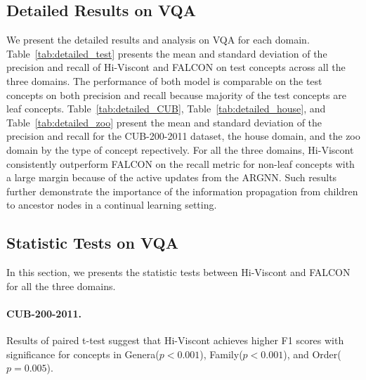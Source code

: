\begin{table*}[t]
\caption{The mean and standard deviation of precision and recall for the two models on the zoo domain by type of concepts.}
\label{tab:detailed_zoo}
\end{table*}

\subsection{Detailed Results on VQA}
We present the detailed results and analysis on VQA for each domain. Table~\ref{tab:detailed_test} presents the mean and standard deviation of the precision and recall of Hi-Viscont and FALCON on test concepts across all the three domains. The performance of both model is comparable on the test concepts on both precision and recall because majority of the test concepts are leaf concepts. Table~\ref{tab:detailed_CUB}, Table~\ref{tab:detailed_house}, and Table~\ref{tab:detailed_zoo} present the mean and standard deviation of the precision and recall for the CUB-200-2011 dataset, the house domain, and the zoo domain by the type of concept repectively. For all the three domains, Hi-Viscont consistently outperform FALCON on the recall metric for non-leaf concepts with a large margin because of the active updates from the ARGNN. Such results further demonstrate the importance of the information propagation from children to ancestor nodes in a continual learning setting.

\subsection{Statistic Tests on VQA}
In this section, we presents the statistic tests between Hi-Viscont and FALCON for all the three domains. 
\paragraph{CUB-200-2011.} Results of paired t-test suggest that Hi-Viscont achieves higher F1 scores with significance for concepts in Genera($p<0.001$), Family($p<0.001$), and Order($p=0.005$).
